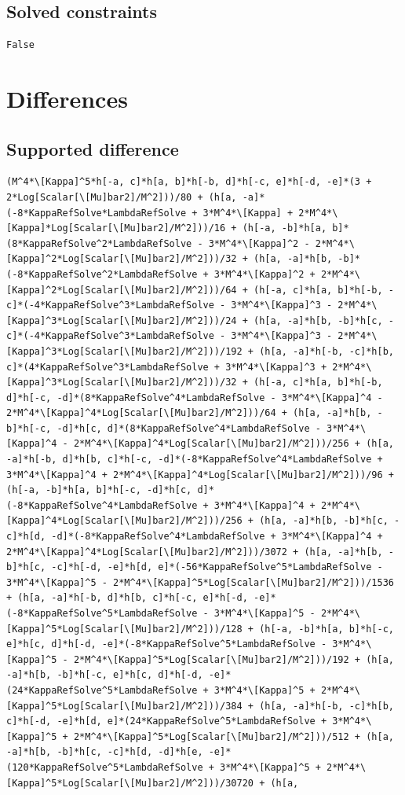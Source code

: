 \documentclass[11pt]{article}
\begin{document}
\subsection{Solved constraints}
\begin{verbatim}
False
\end{verbatim}
\section{Differences}
\subsection{Supported difference}
\begin{verbatim}
(M^4*\[Kappa]^5*h[-a, c]*h[a, b]*h[-b, d]*h[-c, e]*h[-d, -e]*(3 + 2*Log[Scalar[\[Mu]bar2]/M^2]))/80 + (h[a, -a]*(-8*KappaRefSolve*LambdaRefSolve + 3*M^4*\[Kappa] + 2*M^4*\[Kappa]*Log[Scalar[\[Mu]bar2]/M^2]))/16 + (h[-a, -b]*h[a, b]*(8*KappaRefSolve^2*LambdaRefSolve - 3*M^4*\[Kappa]^2 - 2*M^4*\[Kappa]^2*Log[Scalar[\[Mu]bar2]/M^2]))/32 + (h[a, -a]*h[b, -b]*(-8*KappaRefSolve^2*LambdaRefSolve + 3*M^4*\[Kappa]^2 + 2*M^4*\[Kappa]^2*Log[Scalar[\[Mu]bar2]/M^2]))/64 + (h[-a, c]*h[a, b]*h[-b, -c]*(-4*KappaRefSolve^3*LambdaRefSolve - 3*M^4*\[Kappa]^3 - 2*M^4*\[Kappa]^3*Log[Scalar[\[Mu]bar2]/M^2]))/24 + (h[a, -a]*h[b, -b]*h[c, -c]*(-4*KappaRefSolve^3*LambdaRefSolve - 3*M^4*\[Kappa]^3 - 2*M^4*\[Kappa]^3*Log[Scalar[\[Mu]bar2]/M^2]))/192 + (h[a, -a]*h[-b, -c]*h[b, c]*(4*KappaRefSolve^3*LambdaRefSolve + 3*M^4*\[Kappa]^3 + 2*M^4*\[Kappa]^3*Log[Scalar[\[Mu]bar2]/M^2]))/32 + (h[-a, c]*h[a, b]*h[-b, d]*h[-c, -d]*(8*KappaRefSolve^4*LambdaRefSolve - 3*M^4*\[Kappa]^4 - 2*M^4*\[Kappa]^4*Log[Scalar[\[Mu]bar2]/M^2]))/64 + (h[a, -a]*h[b, -b]*h[-c, -d]*h[c, d]*(8*KappaRefSolve^4*LambdaRefSolve - 3*M^4*\[Kappa]^4 - 2*M^4*\[Kappa]^4*Log[Scalar[\[Mu]bar2]/M^2]))/256 + (h[a, -a]*h[-b, d]*h[b, c]*h[-c, -d]*(-8*KappaRefSolve^4*LambdaRefSolve + 3*M^4*\[Kappa]^4 + 2*M^4*\[Kappa]^4*Log[Scalar[\[Mu]bar2]/M^2]))/96 + (h[-a, -b]*h[a, b]*h[-c, -d]*h[c, d]*(-8*KappaRefSolve^4*LambdaRefSolve + 3*M^4*\[Kappa]^4 + 2*M^4*\[Kappa]^4*Log[Scalar[\[Mu]bar2]/M^2]))/256 + (h[a, -a]*h[b, -b]*h[c, -c]*h[d, -d]*(-8*KappaRefSolve^4*LambdaRefSolve + 3*M^4*\[Kappa]^4 + 2*M^4*\[Kappa]^4*Log[Scalar[\[Mu]bar2]/M^2]))/3072 + (h[a, -a]*h[b, -b]*h[c, -c]*h[-d, -e]*h[d, e]*(-56*KappaRefSolve^5*LambdaRefSolve - 3*M^4*\[Kappa]^5 - 2*M^4*\[Kappa]^5*Log[Scalar[\[Mu]bar2]/M^2]))/1536 + (h[a, -a]*h[-b, d]*h[b, c]*h[-c, e]*h[-d, -e]*(-8*KappaRefSolve^5*LambdaRefSolve - 3*M^4*\[Kappa]^5 - 2*M^4*\[Kappa]^5*Log[Scalar[\[Mu]bar2]/M^2]))/128 + (h[-a, -b]*h[a, b]*h[-c, e]*h[c, d]*h[-d, -e]*(-8*KappaRefSolve^5*LambdaRefSolve - 3*M^4*\[Kappa]^5 - 2*M^4*\[Kappa]^5*Log[Scalar[\[Mu]bar2]/M^2]))/192 + (h[a, -a]*h[b, -b]*h[-c, e]*h[c, d]*h[-d, -e]*(24*KappaRefSolve^5*LambdaRefSolve + 3*M^4*\[Kappa]^5 + 2*M^4*\[Kappa]^5*Log[Scalar[\[Mu]bar2]/M^2]))/384 + (h[a, -a]*h[-b, -c]*h[b, c]*h[-d, -e]*h[d, e]*(24*KappaRefSolve^5*LambdaRefSolve + 3*M^4*\[Kappa]^5 + 2*M^4*\[Kappa]^5*Log[Scalar[\[Mu]bar2]/M^2]))/512 + (h[a, -a]*h[b, -b]*h[c, -c]*h[d, -d]*h[e, -e]*(120*KappaRefSolve^5*LambdaRefSolve + 3*M^4*\[Kappa]^5 + 2*M^4*\[Kappa]^5*Log[Scalar[\[Mu]bar2]/M^2]))/30720 + (h[a, 
\end{verbatim}
\end{document}
